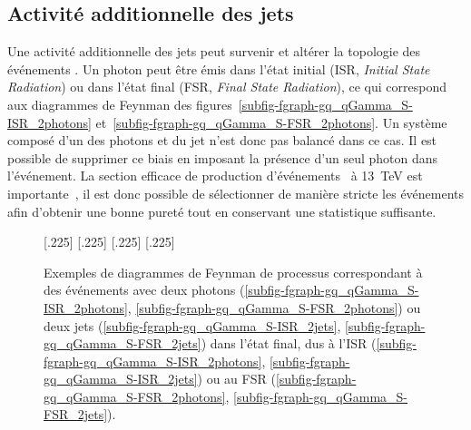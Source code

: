 \subsection{Activité additionnelle des jets}\label{chapter-JERC-section-pheno-GJets-subsec-effets_radiatifs}
Une activité additionnelle des jets peut survenir et altérer la topologie des événements \Gjets.
Un photon peut être émis dans l'état initial (ISR, \emph{Initial State Radiation}) ou dans l'état final (FSR, \emph{Final State Radiation}), ce qui correspond aux diagrammes de Feynman des figures~\ref{subfig-fgraph-gq_qGamma_S-ISR_2photons} et~\ref{subfig-fgraph-gq_qGamma_S-FSR_2photons}.
Un système composé d'un des photons et du jet n'est donc pas balancé dans ce cas.
Il est possible de supprimer ce biais en imposant la présence d'un seul photon dans l'événement.
La section efficace de production d'événements \Gjets\ à \SI{13}{\TeV} est importante~\cite{Gjet_xsec_2018}, il est donc possible de sélectionner de manière stricte les événements afin d'obtenir une bonne pureté tout en conservant une statistique suffisante.
\begin{figure}[h]
\centering\vspace{\baselineskip}
\subcaptionbox{\label{subfig-fgraph-gq_qGamma_S-ISR_2photons}}[.225\textwidth]
{\vspace{\baselineskip}}
\hfill
\subcaptionbox{\label{subfig-fgraph-gq_qGamma_S-FSR_2photons}}[.225\textwidth]
{\vspace{\baselineskip}}
\hfill
\subcaptionbox{\label{subfig-fgraph-gq_qGamma_S-ISR_2jets}}[.225\textwidth]
{\vspace{\baselineskip}}
\hfill
\subcaptionbox{\label{subfig-fgraph-gq_qGamma_S-FSR_2jets}}[.225\textwidth]
{\vspace{\baselineskip}}
\caption[Diagrammes de Feynman de processus avec ISR ou FSR.]{Exemples de diagrammes de Feynman de processus correspondant à des événements avec deux photons (\ref{subfig-fgraph-gq_qGamma_S-ISR_2photons}, \ref{subfig-fgraph-gq_qGamma_S-FSR_2photons}) ou deux jets (\ref{subfig-fgraph-gq_qGamma_S-ISR_2jets}, \ref{subfig-fgraph-gq_qGamma_S-FSR_2jets}) dans l'état final, dus à l'ISR (\ref{subfig-fgraph-gq_qGamma_S-ISR_2photons}, \ref{subfig-fgraph-gq_qGamma_S-ISR_2jets}) ou au FSR (\ref{subfig-fgraph-gq_qGamma_S-FSR_2photons}, \ref{subfig-fgraph-gq_qGamma_S-FSR_2jets}).}
\label{fig-fgraph-gamma_plus_jets-ISR-FSR}
\end{figure}
